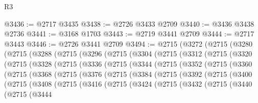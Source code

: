 \begin{lexlean}{R3}
\begin{coremodule}
@3436 := @2717 @3435
@3438 := @2726 @3433 @2709
@3440 := @3436 @3438 @2736
@3441 := @3168 @1703
@3443 := @2719 @3441 @2709
@3444 := @2717 @3443
@3446 := @2726 @3441 @2709
@3494 := @2715
    (@3272
      (@2715
        (@3280
          (@2715
            (@3288
              (@2715
                (@3296
                  (@2715
                    (@3304
                      (@2715
                        (@3312
                          (@2715
                            (@3320
                              (@2715
                                (@3328
                                  (@2715
                                    (@3336
                                      (@2715
                                        (@3344
                                          (@2715
                                            (@3352
                                              (@2715
                                                (@3360
                                                  (@2715
                                                    (@3368
                                                      (@2715
                                                        (@3376
                                                          (@2715
                                                            (@3384
                                                              (@2715
                                                                (@3392
                                                                  (@2715
                                                                    (@3400
                                                                      (@2715
                                                                        (@3408
                                                                          (@2715
                                                                            (@3416
                                                                              (@2715
                                                                                (@3424
                                                                                  (@2715
                                                                                    (@3432
                                                                                      (@2715
                                                                                        (@3440
                                                                                          (@2715
                                                                                            (@3444

\end{coremodule}
\end{lexlean}
